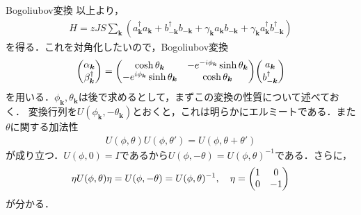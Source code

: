 \documentclass[dvipdfmx,9pt]{beamer}
\numberwithin{equation}{section}
\begin{document}
\begin{frame}{Bogoliubov変換}
    以上より，
    \begin{align}
        H = zJS \sum_{\bm{k}}(a_{\bm{k}}^\dagger a_{\bm{k}} + b_{-\bm{k}}^\dagger b_{-\bm{k}} + \gamma_{\bm{k}} a_{\bm{k}} b_{-\bm{k}} + \gamma_{\bm{k}} a_{\bm{k}}^\dagger b_{-\bm{k}}^\dagger)
    \end{align}
    を得る．これを対角化したいので，Bogoliubov変換
    \begin{align}
        \mqty(\alpha_{\bm{k}}\\ \beta_{\bm{k}}^\dagger) =
        \mqty(
            \cosh \theta_{\bm{k}} & -e^{-i\phi_{\bm{k}}}\sinh \theta_{\bm{k}} \\
            -e^{i\phi_{\bm{k}}}\sinh\theta_{\bm{k}} & \cosh \theta_{\bm{k}}
        )
        \mqty(a_{\bm{k}}\\b_{-\bm{k}}^\dagger)
        \label{HP method: Bogoliubov transformation}
    \end{align}
    を用いる．$\phi_{\bm{k}},\theta_{\bm{k}}$は後で求めるとして，まずこの変換の性質について述べておく．
    変換行列を$U(\phi_{\bm{k}},-\theta_{\bm{k}})$とおくと，これは明らかにエルミートである．また$\theta$に関する加法性
    \begin{align}
        U(\phi,\theta)U(\phi,\theta') = U(\phi,\theta + \theta')
    \end{align}
    が成り立つ．$U(\phi,0) = I$であるから$U(\phi,-\theta) = U(\phi,\theta)^{-1}$である．さらに，
    \begin{align}
        \eta U(\phi,\theta) \eta = U(\phi,-\theta) = U(\phi,\theta)^{-1}, \quad \eta = \mqty(1&0\\0&-1)
    \end{align}
    が分かる．
\end{frame}
\end{document}
